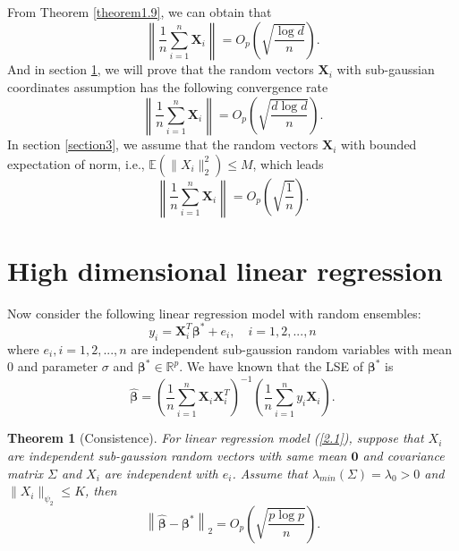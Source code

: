 \documentclass[12pt]{article}
\numberwithin{equation}{section}
\newtheorem{theorem}{Theorem}[section]
\begin{document}
From Theorem \ref{theorem1.9}, we can obtain that
$$
\left\|\frac{1}{n}\sum_{i=1}^{n} \mathbf{X}_{i}\right\|=O_p\left(\sqrt{\frac{\log d}{n}}\right).
$$
And in section \ref{section2}, we will prove that the random vectors $\boldsymbol{X}_i$ with sub-gaussian coordinates assumption has the following convergence rate
$$
\left\|\frac{1}{n}\sum_{i=1}^{n} \mathbf{X}_{i}\right\|=O_p\left(\sqrt{\frac{d\log d}{n}}\right).
$$
In section \ref{section3}, we assume that the random vectors $\boldsymbol{X}_i$ with bounded expectation of norm, i.e., $\mathbb{E}\left(\|X_i\|_2^2\right)\leq M$, which leads
$$
\left\|\frac{1}{n}\sum_{i=1}^{n} \mathbf{X}_{i}\right\|=O_p\left(\sqrt{\frac{1}{n}}\right).
$$
\section{High dimensional linear regression}\label{section2}
Now consider the following linear regression model with random ensembles:
\begin{equation}\label{2.1}
y_i=\boldsymbol{X}_i^T\boldsymbol{\beta}^{*}+e_i,\quad i=1,2,...,n
\end{equation}
where $e_i,i=1,2,...,n$ are independent sub-gaussion random variables with mean 0 and parameter $\sigma$ and $\boldsymbol{\beta}^{*}\in \mathbb{R}^p$. We have known that the LSE of $\boldsymbol{\beta}^{*}$ is 
\begin{equation}
\boldsymbol{\widehat{\beta}}=\left(\frac{1}{n}\sum_{i=1}^{n}\boldsymbol{X}_i\boldsymbol{X}_i^T\right)^{-1}\left(\frac{1}{n}\sum_{i=1}^ny_i\boldsymbol{X}_i\right).
\end{equation}
\begin{theorem}[Consistence]\label{theorem2.1}
	For linear regression model (\ref{2.1}), suppose that $X_i$ are independent sub-gaussion random vectors with same mean $\boldsymbol{0}$ and covariance matrix $\Sigma$ and $X_i$ are independent with $e_i$. Assume that $\lambda_{min}(\Sigma)=\lambda_0>0$ and $\|X_i\|_{\psi_{2}}\leq K$, then
	\begin{equation}
	\left\|\boldsymbol{\widehat{\beta}}-\boldsymbol{\beta}^{*}\right\|_2=O_p\left(\sqrt{\frac{p\log p}{n}}\right).
	\end{equation}
\end{theorem}
\end{document}
